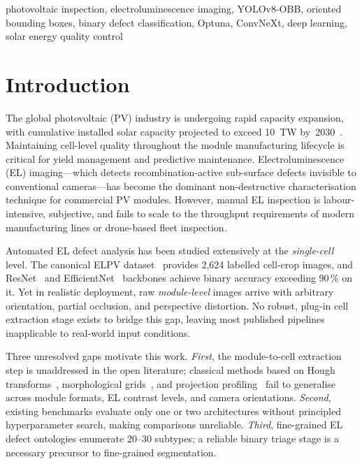 \documentclass[conference]{IEEEtran}
\begin{document}
\begin{IEEEkeywords}
photovoltaic inspection, electroluminescence imaging,
YOLOv8-OBB, oriented bounding boxes, binary defect
classification, Optuna, ConvNeXt, deep learning,
solar energy quality control
\end{IEEEkeywords}

\section{Introduction}

The global photovoltaic (PV) industry is undergoing rapid
capacity expansion, with cumulative installed solar capacity
projected to exceed 10~TW by~2030~\cite{iea2023}.
Maintaining cell-level quality throughout the module
manufacturing lifecycle is critical for yield management and
predictive maintenance.
Electroluminescence (EL) imaging---which detects
recombination-active sub-surface defects invisible to
conventional cameras---has become the dominant
non-destructive characterisation technique for commercial PV
modules.
However, manual EL inspection is labour-intensive, subjective,
and fails to scale to the throughput requirements of modern
manufacturing lines or drone-based fleet inspection.

Automated EL defect analysis has been studied extensively at
the \textit{single-cell} level.
The canonical ELPV dataset~\cite{deitsch2019} provides
2{,}624 labelled cell-crop images, and ResNet~\cite{he2016}
and EfficientNet~\cite{tan2019} backbones achieve binary
accuracy exceeding 90\,\% on it.
Yet in realistic deployment, raw \textit{module-level} images
arrive with arbitrary orientation, partial occlusion, and
perspective distortion.
No robust, plug-in cell extraction stage exists to bridge
this gap, leaving most published pipelines inapplicable to
real-world input conditions.

Three unresolved gaps motivate this work.
\textit{First}, the module-to-cell extraction step is
unaddressed in the open literature; classical methods based on
Hough transforms~\cite{duda1972}, morphological
grids~\cite{soille2003}, and projection
profiling~\cite{wong1982} fail to generalise across module
formats, EL contrast levels, and camera orientations.
\textit{Second}, existing benchmarks evaluate only one or two
architectures without principled hyperparameter search,
making comparisons unreliable.
\textit{Third}, fine-grained EL defect ontologies enumerate
20--30 subtypes; a reliable binary triage stage is a
necessary precursor to fine-grained segmentation.
\end{document}

